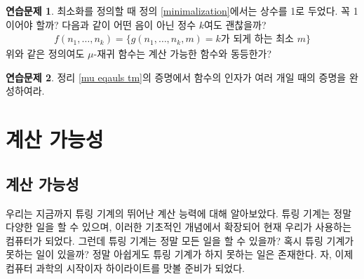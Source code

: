\documentclass[b5paper, 11pt]{book}
\theoremstyle{definition}
\newtheorem{ec}{연습문제}[chapter]
\begin{document}
\begin{ec}
    최소화를 정의할 때 정의 \ref{minimalization}에서는 상수를 1로 두었다. 꼭 1이어야 할까? 다음과 같이 어떤 음이 아닌 정수 $k$여도 괜찮을까?
    \begin{align*}
        f(n_1, \ldots, n_k) = \{g(n_1, \ldots, n_k, m) = k\text{가 되게 하는 최소 } m\}
    \end{align*}
    위와 같은 정의여도 $\mu$-재귀 함수는 계산 가능한 함수와 동등한가?
\end{ec}
\begin{ec}\label{several mu}
    정리 \ref{mu eqauls tm}의 증명에서 함수의 인자가 여러 개일 때의 증명을 완성하여라.
\end{ec}
\part{계산 가능성}
\chapter{계산 가능성}\label{computability}
우리는 지금까지 튜링 기계의 뛰어난 계산 능력에 대해 알아보았다. 튜링 기계는 정말 다양한 일을 할 수 있으며,
이러한 기초적인 개념에서 확장되어 현재 우리가 사용하는 컴퓨터가 되었다. 그런데 튜링 기계는 정말 모든 일을
할 수 있을까? 혹시 튜링 기계가 못하는 일이 있을까? 정말 아쉽게도 튜링 기계가 하지 못하는 일은 존재한다.
자, 이제 컴퓨터 과학의 시작이자 하이라이트를 맛볼 준비가 되었다.
\end{document}
